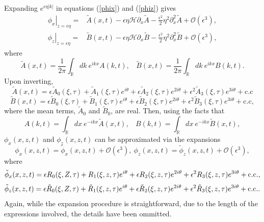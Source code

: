 \documentclass[a4paper,11pt]{article}
\newcommand{\p}{\partial}
\begin{document}
Expanding $e^{\epsilon \eta |k|}$ in equations (\ref{phix}) and (\ref{phiz}) gives
\begin{align*}
\left.\phi_{x}\right|_{z=\epsilon\eta} = & \tilde{A}(x,t) - \epsilon\eta\mathcal{H}\p_{x}\tilde{A} - \frac{\epsilon^{2}}{2}\eta^{2}\p_{x}^{2}\tilde{A} +\mathcal{O}(\epsilon^{3}),\\
\left.\phi_{z}\right|_{z=\epsilon\eta} = & \tilde{B}(x,t) - \epsilon\eta\mathcal{H}\p_{x}\tilde{B} - \frac{\epsilon^{2}}{2}\eta^{2}\p_{x}^{2}\tilde{B} +\mathcal{O}(\epsilon^{3}),
\end{align*}
where
\[
\tilde{A}(x,t) = \frac{1}{2\pi}\int_{\mathbb{R}}dk~ e^{ikx} A(k,t), ~~~~ \tilde{B}(x,t) = \frac{1}{2\pi}\int_{\mathbb{R}}dk~ e^{ikx} B(k,t).
\]
Upon inverting,
\begin{equation*}
\tilde{A}(x,t) = \epsilon\tilde{A}_{0}(\xi,\tau) + \tilde{A}_{1}(\xi,\tau) e^{i\theta} + \epsilon\tilde{A}_{2}(\xi,\tau) e^{2i\theta} + \epsilon^{2}\tilde{A}_{3}(\xi,\tau) e^{3i\theta} +\mbox{c.c}
\end{equation*}
\begin{equation*}
\tilde{B}(x,t) = \epsilon\tilde{B}_{0}(\xi,\tau) + \tilde{B}_{1}(\xi,\tau) e^{i\theta} + \epsilon\tilde{B}_{2}(\xi,\tau) e^{2i\theta} + \epsilon^{2}\tilde{B}_{3}(\xi,\tau) e^{3i\theta} + \mbox{c.c},
\end{equation*}
where the mean terms, $\tilde{A}_{0}$ and $\tilde{B}_{0}$, are real.
Then, using the facts that
\[
A(k,t) = \int_{\mathbb{R}}dx~ e^{-ikx} \tilde{A}(x,t), ~~~~ B(k,t) =
\int_{\mathbb{R}}dx~ e^{-ikx} \tilde{B}(x,t),
\]
$\phi_{x}(x,z,t)$ and $\phi_{z}(x,z,t)$ can be approximated via the expansions
\[
\phi_{x}(x,z,t) = \tilde{\phi}_{x}(x,z,t) + \mathcal{O}(\epsilon^{3}), ~ \phi_{z}(x,z,t) = \tilde{\phi}_{z}(x,z,t) + \mathcal{O}(\epsilon^{3}),
\]
where 
\begin{equation}
\tilde{\phi}_{x}(x,z,t) = \epsilon R_{0}(\xi,Z,\tau) + R_{1}(\xi,z,\tau)e^{i\theta} \\+ \epsilon R_{2}(\xi,z,\tau)e^{2i\theta} + \epsilon^{2}R_{3}(\xi,z,\tau)e^{3i\theta} + \mbox{c.c.},
\label{phixexp}
\end{equation}
\begin{equation}
\tilde{\phi}_{z}(x,z,t) = \epsilon \tilde{R}_{0}(\xi,Z,\tau) + \tilde{R}_{1}(\xi,z,\tau)e^{i\theta} \\+ \epsilon \tilde{R}_{2}(\xi,z,\tau)e^{2i\theta} 
+ \epsilon^{2}\tilde{R}_{3}(\xi,z,\tau)e^{3i\theta} + \mbox{c.c.}.
\label{phizexp}
\end{equation}
Again, while the expansion procedure is straightforward, due to the length of the expressions involved, the details have been ommitted.
\end{document}

